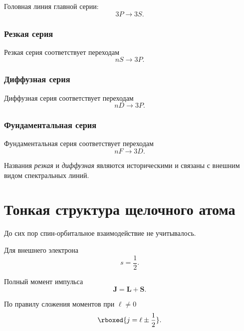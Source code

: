 \documentclass[../final.tex]{subfiles}
\begin{document}
Головная линия главной серии:
\begin{equation*}
    3P\rightarrow3S.
\end{equation*}

\subsubsection{Резкая серия}

Резкая серия соответствует переходам
\begin{equation*}
    nS\rightarrow3P.
\end{equation*}

\subsubsection{Диффузная серия}

Диффузная серия соответствует переходам
\begin{equation*}
    nD\rightarrow3P.
\end{equation*}

\subsubsection{Фундаментальная серия}

Фундаментальная серия соответствует переходам
\begin{equation*}
    nF\rightarrow3D.
\end{equation*}

Названия \emph{резкая} и \emph{диффузная} являются историческими
и связаны с внешним видом спектральных линий.

\section{Тонкая структура щелочного атома}

До сих пор спин-орбитальное взаимодействие не учитывалось.

Для внешнего электрона
\begin{equation*}
    s=\frac12.
\end{equation*}

Полный момент импульса
\begin{equation*}
    \mathbf J
    =
    \mathbf L+\mathbf S.
\end{equation*}

По правилу сложения моментов при \(\ell\neq0\)
\begin{equation*}
    \rboxed{
        j
        =
        \ell\pm\frac12
    }.
\end{equation*}
\end{document}
